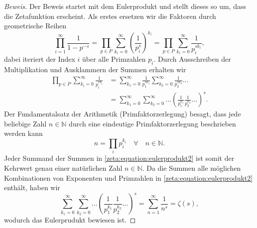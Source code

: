 \begin{proof}[Beweis]
    Der Beweis startet mit dem Eulerprodukt und stellt dieses so um, dass die Zetafunktion erscheint.
    Als erstes ersetzen wir die Faktoren durch geometrische Reihen
    \begin{equation}
        \prod_{i=1}^{\infty}
        \frac{1}{1-p^{-s}}
        =
        \prod_{p \in P}
        \sum_{k_i=0}^{\infty}
        \left(
        \frac{1}{p_i^s}
        \right)^{k_i}
        =
        \prod_{p \in P}
        \sum_{k_i=0}^{\infty}
        \frac{1}{p_i^{s k_i}},
    \end{equation}
    dabei iteriert der Index $i$ über alle Primzahlen $p_i$.
    Durch Ausschreiben der Multiplikation und Ausklammern der Summen erhalten wir
    \begin{align}
        \prod_{p \in P}
        \sum_{k_i=0}^{\infty}
        \frac{1}{p_i^{s k_i}}
        &=
        \sum_{k_1=0}^{\infty}
        \frac{1}{p_1^{s k_1}}
        \sum_{k_2=0}^{\infty}
        \frac{1}{p_2^{s k_2}}
        \ldots
        \nonumber \\
        &=
        \sum_{k_1=0}^{\infty}
        \sum_{k_2=0}^{\infty}
        \ldots
        \left(
        \frac{1}{p_1^{k_1}}
        \frac{1}{p_2^{k_2}}
        \ldots
        \right)^s.
        \label{zeta:equation:eulerprodukt2}
    \end{align}
    Der Fundamentalsatz der Arithmetik (Primfaktorzerlegung) besagt, dass jede beliebige Zahl $n \in \mathbb{N}$ durch eine eindeutige Primfaktorzerlegung beschrieben werden kann
    \begin{equation}
        n = \prod_i p_i^{k_i} \quad \forall \quad n \in \mathbb{N}.
    \end{equation}
    Jeder Summand der Summen in \eqref{zeta:equation:eulerprodukt2} ist somit der Kehrwert genau einer natürlichen Zahl $n \in \mathbb{N}$.
    Da die Summen alle möglichen Kombinationen von Exponenten und Primzahlen in \eqref{zeta:equation:eulerprodukt2} enthält, haben wir
    \begin{equation}
        \sum_{k_1=0}^{\infty}
        \sum_{k_2=0}^{\infty}
        \ldots
        \left(
        \frac{1}{p_1^{k_1}}
        \frac{1}{p_2^{k_2}}
        \ldots
        \right)^s
        =
        \sum_{n=1}^\infty
        \frac{1}{n^s}
        =
        \zeta(s),
    \end{equation}
    wodurch das Eulerprudukt bewiesen ist.
\end{proof}

